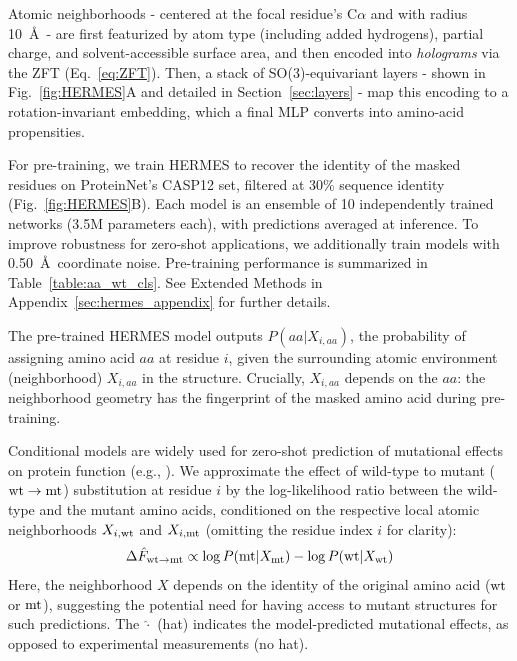 Atomic neighborhoods - centered at the focal residue's C$\alpha$ and with radius 10~\AA~- are 
first featurized by atom type (including added hydrogens), partial charge,
and solvent-accessible surface area, and then encoded into \textit{holograms} via the ZFT
(Eq.~\ref{eq:ZFT}). Then, a stack of SO(3)-equivariant layers - shown in Fig.~\ref{fig:HERMES}A and detailed
in Section~\ref{sec:layers} - map this encoding to a
rotation-invariant embedding, which a final MLP converts into amino-acid propensities.

For pre-training, we train HERMES to recover the identity of the masked residues on ProteinNet's
CASP12 set, filtered at 30\% sequence identity~\citep{alquraishi_proteinnet_2019}
(Fig.~\ref{fig:HERMES}B). Each model is an ensemble of 10 independently trained networks (3.5M
parameters each), with predictions averaged at inference. To improve robustness for zero-shot
applications, we additionally train models with 0.50~\AA~coordinate noise. Pre-training performance
is summarized in Table~\ref{table:aa_wt_cls}. See Extended Methods in Appendix~\ref{sec:hermes_appendix}
for further details.


The pre-trained HERMES model outputs $P(aa| X_{i,aa})$, the probability of assigning amino acid $aa$
at residue $i$, given the surrounding atomic environment (neighborhood) $X_{i,aa}$ in the structure.
Crucially, $X_{i,aa}$ depends on the $aa$: the neighborhood geometry has the fingerprint of the
masked amino acid during pre-training.

Conditional models are widely used for zero-shot prediction of mutational effects on protein
function (e.g., \citep{riesselman_deep_2018, meier_language_2021, pun_learning_2024}). We
approximate the effect of wild-type to mutant (${\text{wt}} \to {\text{mt}}$) substitution at residue $i$ by the
log-likelihood ratio between the wild-type and the mutant amino acids, conditioned on the respective
local atomic neighborhoods $X_{i,{\text{wt}}}$ and $X_{i,{\text{mt}}}$ (omitting the residue index $i$ for clarity):
\begin{equation}
\begin{aligned}
  \Delta \hat F_{{\text{wt}} \to {\text{mt}}}  \propto  \log P({\text{mt}} | X_{{\text{mt}}}) - \log P({\text{wt}} | X_{{\text{wt}}})
\end{aligned}
\label{eq:log_ratio_wt_and_mt}
\end{equation}
Here, the neighborhood $X$ depends on the identity of the original amino acid (${\text{wt}}$ or ${\text{mt}}$),
suggesting the potential need for having access to mutant structures for such predictions. The
$\hat\cdot$ {(hat)} indicates the model-predicted mutational effects, as opposed to experimental
measurements (no hat).

